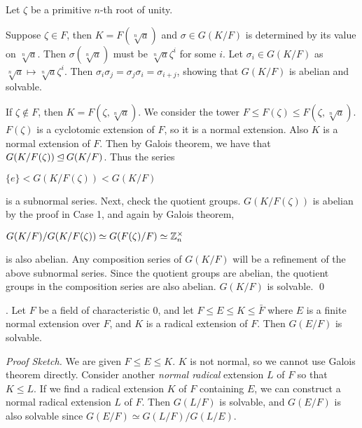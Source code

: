 \pf Let \(\zeta\) be a primitive \(n\)-th root of unity.

 Suppose \(\zeta \in F\), then \(K = F(\sqrt[n]{a})\) and \(\sigma \in G(K/F)\) is determined by its value on \(\sqrt[n]{a}\). Then \(\sigma(\sqrt[n]{a})\) must be \(\sqrt[n]{a}\zeta^i\) for some \(i\). Let \(\sigma_i \in G(K/F)\) as \(\sqrt[n]{a} \mapsto \sqrt[n]{a}\zeta^i\). Then \(\sigma_i \sigma_j = \sigma_j \sigma_i = \sigma_{i+j}\), showing that \(G(K/F)\) is abelian and solvable.

 If \(\zeta \notin F\), then \(K = F(\zeta, \sqrt[n]{a})\). We consider the tower \(F \leq F(\zeta) \leq F(\zeta, \sqrt[n]{a})\). \(F(\zeta)\) is a cyclotomic extension of \(F\), so it is a normal extension. Also \(K\) is a normal extension of \(F\). Then by Galois theorem, we have that \(G(K/F(\zeta)) \unlhd G(K/F)\). Thus the series
\begin{center}
    \(\{e\} < G(K/F(\zeta)) < G(K/F)\)
\end{center}
is a subnormal series. Next, check the quotient groups. \(G(K/F(\zeta))\) is abelian by the proof in Case 1, and again by Galois theorem,
\begin{center}
    \(G(K/F) / G(K/F(\zeta)) \simeq G(F(\zeta)/F) \simeq \mathbb{Z}_n^\times\)
\end{center}
is also abelian. Any composition series of \(G(K/F)\) will be a refinement of the above subnormal series. Since the quotient groups are abelian, the quotient groups in the composition series are also abelian. \(G(K/F)\) is solvable. \qed

\thm. Let \(F\) be a field of characteristic \(0\), and let \(F \leq E \leq K \leq \bar{F}\) where \(E\) is a finite normal extension over \(F\), and \(K\) is a radical extension of \(F\). Then \(G(E/F)\) is solvable.

\textit{Proof Sketch.} We are given \(F \leq E \leq K\). \(K\) is not normal, so we cannot use Galois theorem directly. Consider another \textit{normal radical} extension \(L\) of \(F\) so that \(K \leq L\). If we find a radical extension \(K\) of \(F\) containing \(E\), we can construct a normal radical extension \(L\) of \(F\). Then \(G(L/F)\) is solvable, and \(G(E/F)\) is also solvable since \(G(E/F) \simeq G(L/F)/G(L/E)\).

